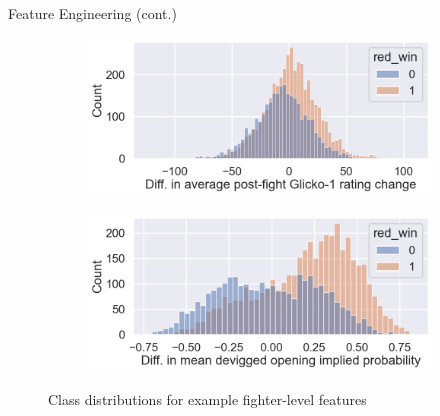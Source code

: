 \documentclass[aspectratio=169,xcolor=dvipsnames]{beamer}
\begin{document}
\begin{frame}{Feature Engineering (cont.)}
    \begin{figure}
    \centering
    \begin{subfigure}{.45\textwidth}
      \centering
      \includegraphics[width=\linewidth]{figures/glicko_1.png}
    \end{subfigure}
    \begin{subfigure}{.45\textwidth}
      \centering
      \includegraphics[width=\linewidth]{figures/opening_implied.png}
    \end{subfigure}
    \caption{Class distributions for example fighter-level features}
    \end{figure}
\end{frame}

\end{document}
